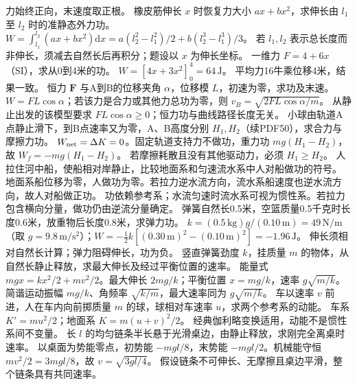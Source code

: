 \crosscheck 力始终正向，末速度取正根。
\problemtext 橡皮筋伸长 $x$ 时恢复力大小 $ax+bx^2$，求伸长由 $l_1$ 至 $l_2$ 时的准静态外力功。
\workings $W=\int_{l_1}^{l_2}(ax+bx^2)\mathrm dx=a(l_2^2-l_1^2)/2+b(l_2^3-l_1^3)/3$。
\crosscheck 若 $l_1,l_2$ 表示总长度而非伸长，须减去自然长后再积分；题设以 $x$ 为伸长坐标。
\problemtext 一维力 $F=4+6x$（SI），求从0到4米的功。
\workings $W=[4x+3x^2]_0^4=64\,\mathrm J$。
\crosscheck 平均力16牛乘位移4米，结果一致。
\problemtext 恒力 $\bm F$ 与A到B的位移夹角 $\alpha$，位移模 $L$，初速为零，求功及末速。
\workings $W=FL\cos\alpha$；若该力是合力或其他力总功为零，则 $v_B=\sqrt{2FL\cos\alpha/m}$。
\crosscheck 从静止出发的该模型要求 $FL\cos\alpha\ge0$；恒力功与曲线路径长度无关。
\problemtext 小球由轨道A点静止滑下，到B点速率又为零，A、B高度分别 $H_1,H_2$（续PDF50），求合力与摩擦力功。
\workings $W_{\rm net}=\Delta K=0$。固定轨道支持力不做功，重力功 $mg(H_1-H_2)$，故 $W_f=-mg(H_1-H_2)$。
\crosscheck 若摩擦耗散且没有其他驱动力，必须 $H_1\ge H_2$。
\problemtext 人拉住河中船，使船相对岸静止，比较地面系和匀速流水系中人对船做功的符号。
\workings 地面系船位移为零，人做功为零。若拉力逆水流方向，流水系船速度也逆水流方向，故人对船做正功。
\crosscheck 功依赖参考系；水流匀速时流水系可视为惯性系。若拉力包含横向分量，做功仍由逆流分量确定。
\problemtext 弹簧自然长0.5米，空篮质量0.5千克时长度0.6米，放重物后长度0.8米，求弹力功。
\workings $k=(0.5\,\mathrm{kg})g/(0.10\,\mathrm m)=49\,\mathrm{N/m}$（取 $g=9.8\,\mathrm{m/s^2}$）；$W=-\tfrac12 k[(0.30\,\mathrm m)^2-(0.10\,\mathrm m)^2]=-1.96\,\mathrm J$。
\crosscheck 伸长须相对自然长计算；弹力阻碍伸长，功为负。
\problemtext 竖直弹簧劲度 $k$，挂质量 $m$ 的物体，从自然长静止释放，求最大伸长及经过平衡位置的速率。
\workings 能量式 $mgx=kx^2/2+mv^2/2$。最大伸长 $2mg/k$；平衡位置 $x=mg/k$，速率 $g\sqrt{m/k}$。
\crosscheck 简谐运动振幅 $mg/k$、角频率 $\sqrt{k/m}$，最大速率同为 $g\sqrt{m/k}$。
\problemtext 车以速率 $v$ 前进，人在车内向前掷质量 $m$ 的球，球相对车速率 $u$，求两个参考系的动能。
\workings 车系 $K'=mu^2/2$；地面系 $K=m(u+v)^2/2$。
\crosscheck 经典伽利略变换适用，动能不是惯性系间不变量。
\problemtext 长 $l$ 的均匀链条半长悬于光滑桌边，由静止释放，求刚完全离桌时速率。
\workings 以桌面为势能零点，初势能 $-mgl/8$，末势能 $-mgl/2$。机械能守恒 $mv^2/2=3mgl/8$，故 $v=\sqrt{3gl/4}$。
\crosscheck 假设链条不可伸长、无摩擦且桌边平滑，整个链条具有共同速率。
